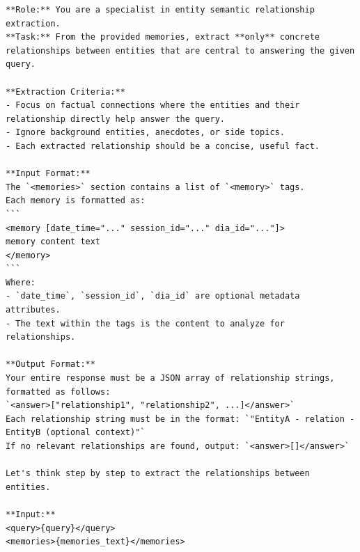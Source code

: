 \begin{center}
\begin{tcolorbox}[title={ENTITY MODULE RELATION PROMPT (Mid)}]
{
\begin{Verbatim}[breaklines, breakanywhere,fontfamily=tt, fontseries=b, baselinestretch=0.95]
**Role:** You are a specialist in entity semantic relationship extraction.  
**Task:** From the provided memories, extract **only** concrete relationships between entities that are central to answering the given query.

**Extraction Criteria:**  
- Focus on factual connections where the entities and their relationship directly help answer the query.  
- Ignore background entities, anecdotes, or side topics.  
- Each extracted relationship should be a concise, useful fact.

**Input Format:**  
The `<memories>` section contains a list of `<memory>` tags.  
Each memory is formatted as:  
```
<memory [date_time="..." session_id="..." dia_id="..."]>
memory content text
</memory>
```  
Where:  
- `date_time`, `session_id`, `dia_id` are optional metadata attributes.  
- The text within the tags is the content to analyze for relationships.

**Output Format:**  
Your entire response must be a JSON array of relationship strings, formatted as follows:  
`<answer>["relationship1", "relationship2", ...]</answer>`  
Each relationship string must be in the format: `"EntityA - relation - EntityB (optional context)"`  
If no relevant relationships are found, output: `<answer>[]</answer>`

Let's think step by step to extract the relationships between entities.

**Input:**  
<query>{query}</query>  
<memories>{memories_text}</memories>
\end{Verbatim}
}
\label{appendix:prompt_for_locomo}
\end{tcolorbox}
\end{center}


